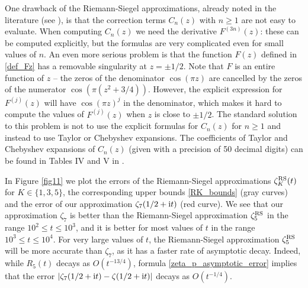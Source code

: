 \documentclass[12pt]{article}
\def\i{{\textnormal i}}
\theoremstyle{definition}
\begin{document}
One drawback of the Riemann-Siegel approximations, already noted in the literature (see \cite[Page 259]{Borwein_2000}), is that the correction terms $C_n(z)$ with $n\ge 1$ are not easy to evaluate. When computing $C_n(z)$ we need the derivative $F^{(3n)}(z)$: these can be computed explicitly, but the formulas are very complicated even for small values of $n$. An even more serious problem is that the function $F(z)$ defined in \eqref{def_Fz} has a removable singularity at $z=\pm 1/2$. Note that $F$ is an entire function of $z$ -- the zeros of the denominator $\cos(\pi z)$ are cancelled by the zeros of the numerator $\cos(\pi (z^2+3/4))$. However, the explicit expression for $F^{(j)}(z)$ will have $\cos(\pi z)^j$ in the denominator, which makes it hard to compute the  values of $F^{(j)}(z)$ when $z$ is close to $\pm 1/2$. The standard solution to this problem is not to use the explicit formulas for $C_n(z)$ for $n\ge 1$ and instead to use Taylor or Chebyshev expansions. The coefficients of Taylor and Chebyshev expansions of $C_n(z)$ (given with a precision of 50 decimal digits) can be found in Tables IV and V in \cite{Gabcke1979}. 


In Figure \ref{fig11} we plot the errors of the Riemann-Siegel approximations $\zeta^{\textnormal{RS}}_K(t)$ for $K\in \{1,3,5\}$, the corresponding upper bounds \eqref{RK_bounds} (gray curves) and the error of our approximation $\zeta_7(1/2+\i t)$ (red curve). We see that our approximation $\zeta_7$ is better than the Riemann-Siegel approximation $\zeta^{\textnormal{RS}}_5$ in the range $10^2\le t \le 10^3$, and it is better for most values of $t$ in the range $10^3 \le t \le 10^4$. For very large values of $t$, the Riemann-Siegel approximation $\zeta^{\textnormal{RS}}_5$ will be more accurate than $\zeta_7$, as it has a faster rate of asymptotic decay. Indeed, while $R_5(t)$ decays as $O(t^{-13/4})$, formula \eqref{zeta_p_asymptotic_error} implies that the error $|\zeta_7(1/2+\i t)-\zeta(1/2+\i t)|$ decays as $O(t^{-1/4})$. 
\end{document}
